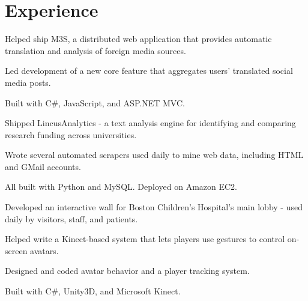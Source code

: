 \documentclass[]{deedy-resume}
\begin{document}
\begin{minipage}[t]{0.61\textwidth}


\section{Experience}
\vspace{\topsep} %
\begin{tightemize}
\item Helped ship M3S, a distributed web application that provides automatic translation and analysis of foreign media sources.
\item Led development of a new core feature that aggregates users' translated social media posts.
\item Built with C\#, JavaScript, and ASP.NET MVC.
\end{tightemize}
\sectionsep

\begin{tightemize}
\item Shipped LincusAnalytics - a text analysis engine for identifying and comparing research funding across universities.
\item Wrote several automated scrapers used daily to mine web data, including HTML and GMail accounts.
\item All built with Python and MySQL. Deployed on Amazon EC2.
\end{tightemize}
\sectionsep


\begin{tightemize}
\item Developed an interactive wall for Boston Children's Hospital's main lobby - used daily by visitors, staff, and patients.
\item Helped write a Kinect-based system that lets players use gestures to control on-screen avatars.
\item Designed and coded avatar behavior and a player tracking system.
\item Built with C\#, Unity3D, and Microsoft Kinect.
\end{tightemize}


\end{minipage}
\end{document}

